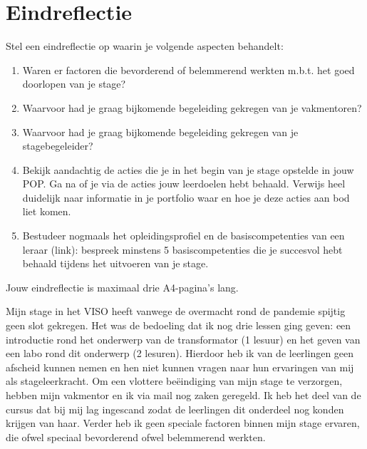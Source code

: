 \documentclass[a4paper,12pt,twoside]{article}%
\begin{document}
	\section{Eindreflectie}
	Stel een eindreflectie op waarin je volgende aspecten behandelt: 
	\begin{enumerate}
		\item Waren er factoren die bevorderend of belemmerend werkten m.b.t. het goed doorlopen van je stage? 
		\item Waarvoor had je graag bijkomende begeleiding gekregen van je vakmentoren? 
		\item Waarvoor had je graag bijkomende begeleiding gekregen van je stagebegeleider? 
		\item Bekijk aandachtig de acties die je in het begin van je stage opstelde in jouw POP. Ga na of je via de acties jouw leerdoelen hebt behaald. Verwijs heel duidelijk naar informatie in je portfolio waar en hoe je deze acties aan bod liet komen. 
		\item  Bestudeer nogmaals het opleidingsprofiel en de basiscompetenties van een leraar (link):  bespreek minstens 5 basiscompetenties die je succesvol hebt behaald tijdens het uitvoeren van je stage. 
	\end{enumerate} 
Jouw eindreflectie is maximaal drie A4-pagina’s lang.\newline\newline
	
Mijn stage in het VISO heeft vanwege de overmacht rond de pandemie spijtig geen slot gekregen. Het was de bedoeling dat ik nog drie lessen ging geven: een introductie rond het onderwerp van de transformator (1 lesuur) en het geven van een labo rond dit onderwerp (2 lesuren). Hierdoor heb ik van de leerlingen geen afscheid kunnen nemen en hen niet kunnen vragen naar hun ervaringen van mij als stageleerkracht. Om een vlottere beëindiging van mijn stage te verzorgen, hebben mijn vakmentor en ik via mail nog zaken geregeld. Ik heb het deel van de cursus dat bij mij lag ingescand zodat de leerlingen dit onderdeel nog konden krijgen van haar. Verder heb ik geen speciale factoren binnen mijn stage ervaren, die ofwel speciaal bevorderend ofwel belemmerend werkten.\newline
\end{document}
